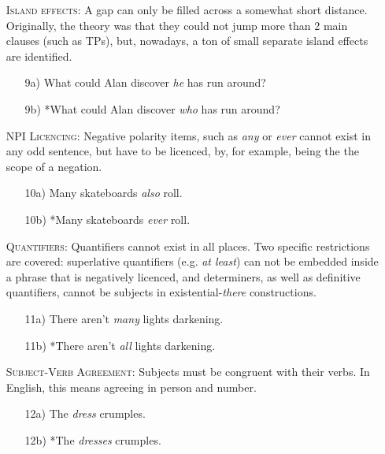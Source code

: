 \documentclass[11pt]{article}
\begin{document}
\begin{itemize}
\item[] \textsc{Island effects}: A gap can only be filled across a somewhat short distance. Originally, the theory was that they could not jump more than 2 main clauses (such as TPs), but, nowadays, a ton of small separate island effects are identified.
    \begin{itemize}
        \item[9a)] What could Alan discover \textit{he} has run around?
        \item[9b)] *What could Alan discover \textit{who} has run around?
    \end{itemize}

\item[] \textsc{NPI Licencing}: Negative polarity items, such as \textit{any} or \textit{ever} cannot exist in any odd sentence, but have to be licenced, by, for example, being the the scope of a negation.
    \begin{itemize}
        \item[10a)] Many skateboards \textit{also} roll.
        \item[10b)] *Many skateboards \textit{ever} roll.
    \end{itemize}

\item[] \textsc{Quantifiers}: Quantifiers cannot exist in all places. Two specific restrictions are covered: superlative quantifiers (e.g. \textit{at least}) can not be embedded inside a phrase that is negatively licenced, and determiners, as well as definitive quantifiers, cannot be subjects in existential-\textit{there} constructions.
    \begin{itemize}
        \item[11a)] There aren’t \textit{many} lights darkening.
        \item[11b)] *There aren’t \textit{all} lights darkening.
    \end{itemize}

\item[] \textsc{Subject-Verb Agreement}: Subjects must be congruent with their verbs. In English, this means agreeing in person and number.
    \begin{itemize}
        \item[12a)] The \textit{dress} crumples.
        \item[12b)] *The \textit{dresses} crumples.
    \end{itemize}
\end{itemize}
\end{document}
